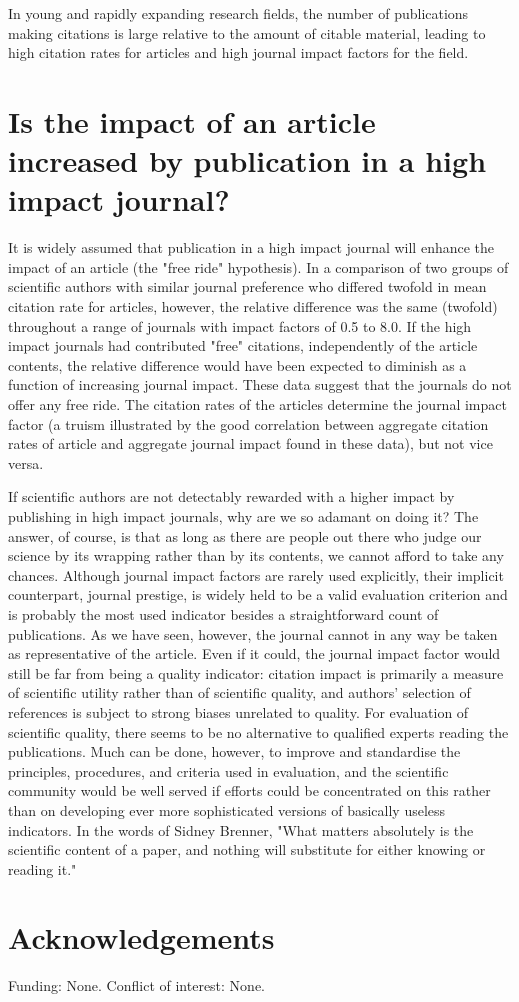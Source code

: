 \documentclass[11pt, a4paper]{article}
\begin{document}
In young and rapidly expanding research fields, the number of publications making citations is
large relative to the amount of citable material, leading to high citation rates for articles
and high journal impact factors for the field.


\section{Is the impact of an article increased by publication in a high impact journal?}

It is widely assumed that publication in a high impact journal will enhance the impact of an
article (the "free ride" hypothesis). In a comparison of two groups of scientific authors
with similar journal preference who differed twofold in mean citation rate for articles, however,
the relative difference was the same (twofold) throughout a range of journals with impact
factors of 0.5 to 8.0. If the high impact journals had contributed "free" citations, independently
of the article contents, the relative difference would have been expected to diminish as
a function of increasing journal impact. These data suggest that the journals do not offer any
free ride. The citation rates of the articles determine the journal impact factor
(a truism illustrated by the good correlation between aggregate citation rates of
article and aggregate journal impact found in these data), but not vice versa.

If scientific authors are not detectably rewarded with a higher impact by publishing in high
impact journals, why are we so adamant on doing it? The answer, of course, is that as long as
there are people out there who judge our science by its wrapping rather than by its contents,
we cannot afford to take any chances. Although journal impact factors are rarely used explicitly,
their implicit counterpart, journal prestige, is widely held to be a valid evaluation criterion
and is probably the most used indicator besides a straightforward count of publications.
As we have seen, however, the journal cannot in any way be taken as representative of the article.
Even if it could, the journal impact factor would still be far from being a quality indicator:
citation impact is primarily a measure of scientific utility rather than of scientific quality,
and authors' selection of references is subject to strong biases unrelated to quality.
For evaluation of scientific quality, there seems to be no alternative to qualified experts
reading the publications. Much can be done, however, to improve and standardise the principles,
procedures, and criteria used in evaluation, and the scientific community would be well
served if efforts could be concentrated on this rather than on developing ever
more sophisticated versions of basically useless indicators. In the words of Sidney Brenner,
"What matters absolutely is the scientific content of a paper, and nothing will substitute for
either knowing or reading it."\footnotemark[1]

\section{Acknowledgements}

Funding: None. Conflict of interest: None.

\end{document}
